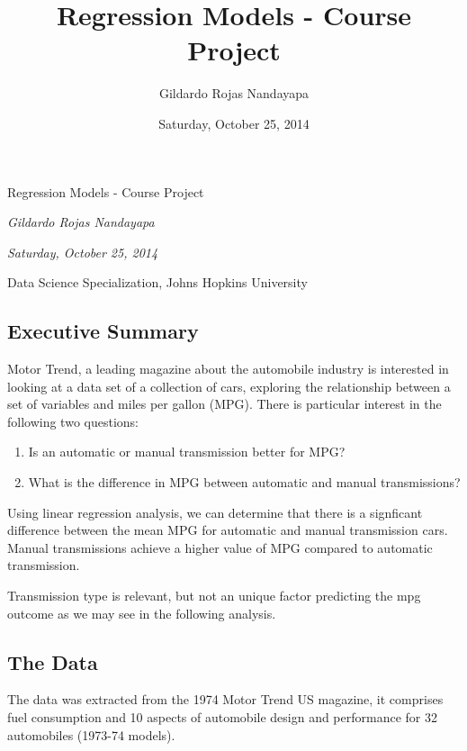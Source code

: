 \documentclass[]{article}
\title{Regression Models - Course Project}
\author{Gildardo Rojas Nandayapa}
\date{Saturday, October 25, 2014}
\begin{document}
\begin{center}
\huge Regression Models - Course Project \\[0.2cm]
\end{center}
\begin{center}
\large \emph{Gildardo Rojas Nandayapa}\\[0.1cm]
\end{center}
\begin{center}
\large \emph{Saturday, October 25, 2014} \\
\end{center}
\normalsize


Data Science Specialization, Johns Hopkins University

\subsection{Executive Summary}\label{executive-summary}

Motor Trend, a leading magazine about the automobile industry is
interested in looking at a data set of a collection of cars, exploring
the relationship between a set of variables and miles per gallon (MPG).
There is particular interest in the following two questions:

\begin{enumerate}
\def\labelenumi{\arabic{enumi}.}
\itemsep1pt\parskip0pt
\item
  Is an automatic or manual transmission better for MPG?
\item
  What is the difference in MPG between automatic and manual
  transmissions?
\end{enumerate}

Using linear regression analysis, we can determine that there is a
signficant difference between the mean MPG for automatic and manual
transmission cars. Manual transmissions achieve a higher value of MPG
compared to automatic transmission.

Transmission type is relevant, but not an unique factor predicting the
mpg outcome as we may see in the following analysis.

\subsection{The Data}\label{the-data}

The data was extracted from the 1974 Motor Trend US magazine, it
comprises fuel consumption and 10 aspects of automobile design and
performance for 32 automobiles (1973-74 models).
\end{document}
